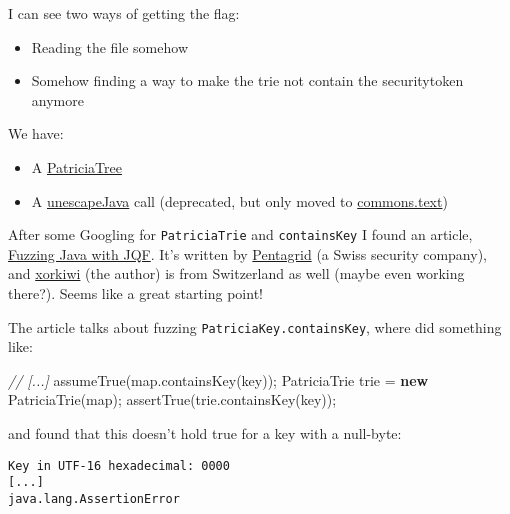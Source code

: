 \documentclass[11pt]{article}
\providecommand{\tightlist}{%
      \setlength{\itemsep}{0pt}\setlength{\parskip}{0pt}}
\newenvironment{Shaded}{}{}
\newcommand{\KeywordTok}[1]{\textcolor[rgb]{0.00,0.44,0.13}{\textbf{{#1}}}}
\newcommand{\CommentTok}[1]{\textcolor[rgb]{0.38,0.63,0.69}{\textit{{#1}}}}
\newcommand{\FunctionTok}[1]{\textcolor[rgb]{0.02,0.16,0.49}{{#1}}}
\newcommand{\NormalTok}[1]{{#1}}
\begin{document}
I can see two ways of getting the flag:

\begin{itemize}
\tightlist
\item
  Reading the file somehow
\item
  Somehow finding a way to make the trie not contain the securitytoken
  anymore
\end{itemize}

We have:

\begin{itemize}
\tightlist
\item
  A
  \href{https://commons.apache.org/proper/commons-collections/apidocs/org/apache/commons/collections4/trie/PatriciaTrie.html}{PatriciaTree}
\item
  A
  \href{https://commons.apache.org/proper/commons-lang/apidocs/org/apache/commons/lang3/StringEscapeUtils.html\#unescapeJava-java.lang.String-}{unescapeJava}
  call (deprecated, but only moved to
  \href{http://commons.apache.org/proper/commons-text/javadocs/api-release/index.html}{commons.text})
\end{itemize}

After some Googling for \texttt{PatriciaTrie} and \texttt{containsKey} I
found an article,
\href{https://www.pentagrid.ch/de/blog/fuzzing_java_with_jqf/}{Fuzzing
Java with JQF}. It's written by
\href{https://www.pentagrid.ch/}{Pentagrid} (a Swiss security company),
and \href{https://twitter.com/xorkiwi}{xorkiwi} (the author) is from
Switzerland as well (maybe even working there?). Seems like a great
starting point!

The article talks about fuzzing \texttt{PatriciaKey.containsKey}, where
did something like:

\begin{Shaded}
\begin{Highlighting}[]
\CommentTok{// [...]}
\FunctionTok{assumeTrue}\NormalTok{(map.}\FunctionTok{containsKey}\NormalTok{(key));}
\NormalTok{PatriciaTrie trie = }\KeywordTok{new} \FunctionTok{PatriciaTrie}\NormalTok{(map);}
\FunctionTok{assertTrue}\NormalTok{(trie.}\FunctionTok{containsKey}\NormalTok{(key));}
\end{Highlighting}
\end{Shaded}

and found that this doesn't hold true for a key with a null-byte:

\begin{verbatim}
Key in UTF-16 hexadecimal: 0000
[...]
java.lang.AssertionError
\end{verbatim}
\end{document}
